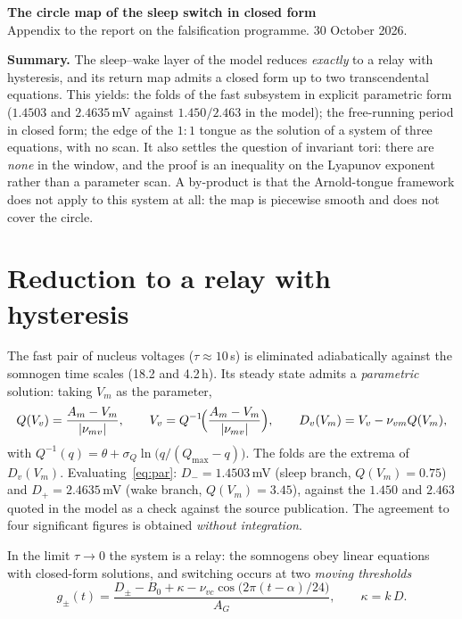 \documentclass[11pt,a4paper]{article}
\begin{document}
\begin{center}
{\large\bfseries The circle map of the sleep switch in closed form}\\[2pt]
{\small Appendix to the report on the falsification programme. 30 October 2026.}
\end{center}
\vspace{-2pt}

\noindent\textbf{Summary.} The sleep--wake layer of the model reduces \emph{exactly} to a relay with
hysteresis, and its return map admits a closed form up to two transcendental equations. This yields:
the folds of the fast subsystem in explicit parametric form ($1.4503$ and $2.4635$\,mV against
$1.450/2.463$ in the model); the free-running period in closed form; the edge of the $1{:}1$ tongue
as the solution of a system of three equations, with no scan. It also settles the question of
invariant tori: there are \emph{none} in the window, and the proof is an inequality on the Lyapunov
exponent rather than a parameter scan. A by-product is that the Arnold-tongue framework does not
apply to this system at all: the map is piecewise smooth and does not cover the circle.

\section{Reduction to a relay with hysteresis}
The fast pair of nucleus voltages ($\tau\approx10$\,s) is eliminated adiabatically against the
somnogen time scales (18.2 and 4.2\,h). Its steady state admits a \emph{parametric} solution: taking
$V_m$ as the parameter,
\begin{equation}\label{eq:par}
Q(V_v)=\frac{A_m-V_m}{|\nu_{mv}|},\qquad V_v=Q^{-1}\!\Bigl(\frac{A_m-V_m}{|\nu_{mv}|}\Bigr),\qquad
D_v(V_m)=V_v-\nu_{vm}Q(V_m),
\end{equation}
with $Q^{-1}(q)=\theta+\sigma_Q\ln\bigl(q/(Q_{\max}-q)\bigr)$. The folds are the extrema of
$D_v(V_m)$. Evaluating~\eqref{eq:par}: $D_-=1.4503$\,mV (sleep branch, $Q(V_m)=0.75$) and
$D_+=2.4635$\,mV (wake branch, $Q(V_m)=3.45$), against the $1.450$ and $2.463$ quoted in the model
as a check against the source publication. The agreement to four significant figures is obtained
\emph{without integration}.

In the limit $\tau\to0$ the system is a relay: the somnogens obey linear equations with closed-form
solutions, and switching occurs at two \emph{moving thresholds}
\begin{equation}\label{eq:thr}
g_\pm(t)=\frac{D_\pm-B_0+\kappa-\nu_{vc}\cos\bigl(2\pi(t-\alpha)/24\bigr)}{A_G},
\qquad \kappa=k\,D .
\end{equation}
\end{document}
